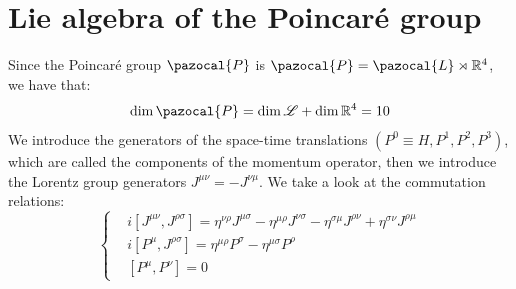 \documentclass[../main.tex]{subfiles}
\begin{document}
\section{Lie algebra of the Poincaré group}
Since the Poincaré group $\pazocal{P}$ is $\pazocal{P}=\pazocal{L}\rtimes\mathbb{R}^4$, we have that:
\[
\dim\pazocal{P}=\dim\mathcal{L}+\dim\mathbb{R}^4=10
\]
We introduce the generators of the space-time translations $(P^0\equiv H,P^1,P^2,P^3)$, which are called the components of the momentum operator, then we introduce the Lorentz group generators $J^{\mu\nu}=-J^{\nu\mu}$. We take a look at the commutation relations:
\[
\left\{
\begin{aligned}
&i[J^{\mu\nu},J^{\rho\sigma}]=\eta^{\nu\rho}J^{\mu\sigma}-\eta^{\mu\rho}J^{\nu\sigma}-\eta^{\sigma\mu}J^{\rho\nu}+\eta^{\sigma\nu}J^{\rho\mu}\\
&i[P^\mu,J^{\rho\sigma}]=\eta^{\mu\rho}P^\sigma-\eta^{\mu\sigma}P^\rho\\
&[P^\mu,P^\nu]=0
\end{aligned}
\right.
\]
\end{document}
